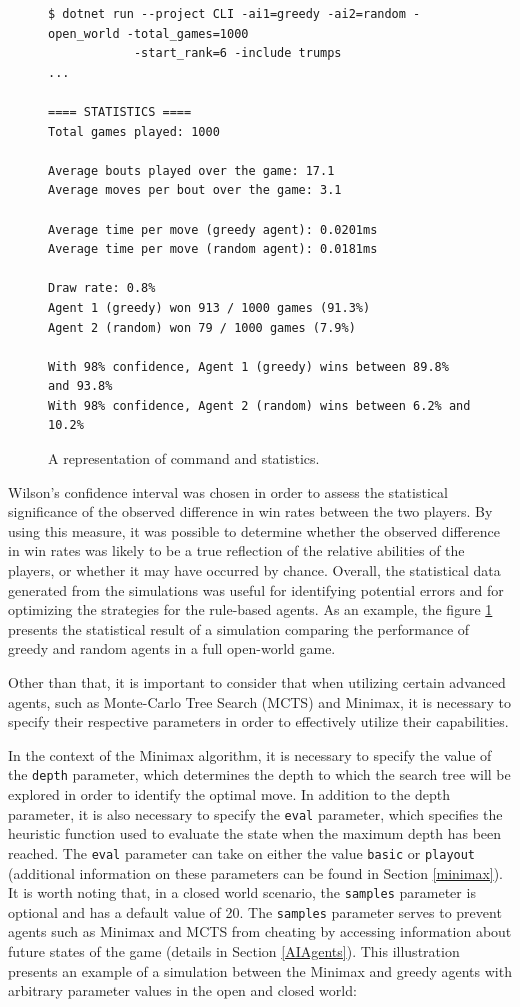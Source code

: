 \begin{figure}[h]
\captionsetup{justification=centering}
\begin{lstlisting}[frame=single]
$ dotnet run --project CLI -ai1=greedy -ai2=random -open_world -total_games=1000 
			-start_rank=6 -include trumps
...

==== STATISTICS ====
Total games played: 1000

Average bouts played over the game: 17.1
Average moves per bout over the game: 3.1

Average time per move (greedy agent): 0.0201ms
Average time per move (random agent): 0.0181ms

Draw rate: 0.8%
Agent 1 (greedy) won 913 / 1000 games (91.3%)
Agent 2 (random) won 79 / 1000 games (7.9%)

With 98% confidence, Agent 1 (greedy) wins between 89.8% and 93.8% 
With 98% confidence, Agent 2 (random) wins between 6.2% and 10.2% 
\end{lstlisting}
\caption{A representation of command and statistics.}
\label{fig:statistics}
\end{figure}

Wilson's confidence interval was chosen in order to assess the statistical significance of the observed difference in win rates between the two players. By using this measure, it was possible to determine whether the observed difference in win rates was likely to be a true reflection of the relative abilities of the players, or whether it may have occurred by chance. Overall, the statistical data generated from the simulations was useful for identifying potential errors and for optimizing the strategies for the rule-based agents. As an example, the figure \ref{fig:statistics}  presents the statistical result of a simulation comparing the performance of greedy and random agents in a full open-world game.

Other than that, it is important to consider that when utilizing certain advanced agents, such as Monte-Carlo Tree Search (MCTS) and Minimax, it is necessary to specify their respective parameters in order to effectively utilize their capabilities. 

In the context of the Minimax algorithm, it is necessary to specify the value of the \texttt{depth} parameter, which determines the depth to which the search tree will be explored in order to identify the optimal move. In addition to the depth parameter, it is also necessary to specify the \texttt{eval} parameter, which specifies the heuristic function used to evaluate the state when the maximum depth has been reached. The \texttt{eval} parameter can take on either the value \texttt{basic} or \texttt{playout} (additional information on these parameters can be found in Section \ref{minimax}). It is worth noting that, in a closed world scenario, the \texttt{samples} parameter is optional and has a default value of 20. The \texttt{samples} parameter serves to prevent agents such as Minimax and MCTS from cheating by accessing information about future states of the game (details in Section \ref{AIAgents}). This illustration presents an example of a simulation between the Minimax and greedy agents with arbitrary parameter values in the open and closed world:\\

